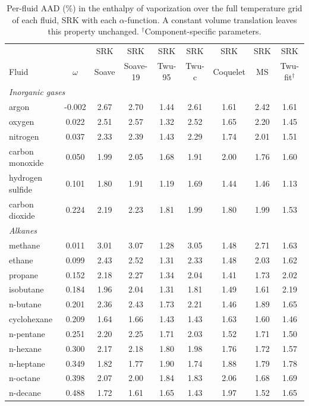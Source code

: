 \begin{table}[H]
\centering
\caption{Per-fluid AAD (\%) in the enthalpy of vaporization over the full temperature grid of each fluid, SRK with each $\alpha$-function. A constant volume translation leaves this property unchanged. $^{\dagger}$Component-specific parameters.}
\label{tab:tabS_perfluid_hvap_srk}
\small
\begin{tabular}{lcccccccc}
\toprule
 &  & SRK & SRK & SRK & SRK & SRK & SRK & SRK \\
Fluid & $\omega$ & Soave & Soave-19 & Twu-95 & Twu-c & Coquelet & MS & Twu-fit$^{\dagger}$ \\
\midrule
\multicolumn{9}{l}{\emph{Inorganic gases}} \\
argon & -0.002 & 2.67 & 2.70 & 1.44 & 2.61 & 1.61 & 2.42 & 1.61 \\
oxygen & 0.022 & 2.51 & 2.57 & 1.32 & 2.52 & 1.65 & 2.20 & 1.45 \\
nitrogen & 0.037 & 2.33 & 2.39 & 1.43 & 2.29 & 1.74 & 2.01 & 1.51 \\
carbon monoxide & 0.050 & 1.99 & 2.05 & 1.68 & 1.91 & 2.00 & 1.76 & 1.60 \\
hydrogen sulfide & 0.101 & 1.80 & 1.91 & 1.19 & 1.69 & 1.44 & 1.46 & 1.13 \\
carbon dioxide & 0.224 & 2.19 & 2.23 & 1.81 & 1.99 & 1.80 & 1.99 & 1.53 \\
\multicolumn{9}{l}{\emph{Alkanes}} \\
methane & 0.011 & 3.01 & 3.07 & 1.28 & 3.05 & 1.48 & 2.71 & 1.63 \\
ethane & 0.099 & 2.43 & 2.52 & 1.31 & 2.33 & 1.48 & 2.03 & 1.62 \\
propane & 0.152 & 2.18 & 2.27 & 1.34 & 2.04 & 1.41 & 1.73 & 2.02 \\
isobutane & 0.184 & 1.96 & 2.04 & 1.31 & 1.81 & 1.49 & 1.61 & 2.19 \\
n-butane & 0.201 & 2.36 & 2.43 & 1.73 & 2.21 & 1.46 & 1.89 & 1.65 \\
cyclohexane & 0.209 & 1.64 & 1.66 & 1.43 & 1.43 & 1.63 & 1.60 & 1.46 \\
n-pentane & 0.251 & 2.20 & 2.25 & 1.71 & 2.03 & 1.52 & 1.71 & 1.50 \\
n-hexane & 0.300 & 2.17 & 2.18 & 1.80 & 1.98 & 1.76 & 1.72 & 1.57 \\
n-heptane & 0.349 & 1.82 & 1.77 & 1.90 & 1.74 & 1.88 & 1.79 & 1.78 \\
n-octane & 0.398 & 2.07 & 2.00 & 1.84 & 1.83 & 2.06 & 1.68 & 1.69 \\
n-decane & 0.488 & 1.72 & 1.61 & 1.65 & 1.43 & 1.97 & 1.52 & 1.65 \\

\end{tabular}
\end{table}

